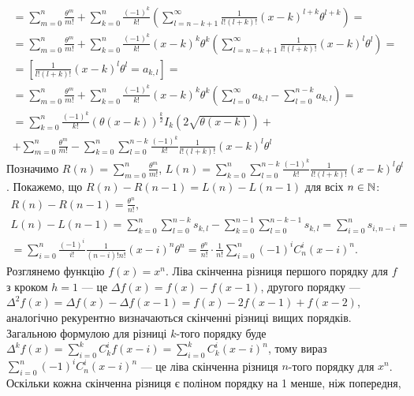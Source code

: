 \begin{gather*}
    = \sum_{m=0}^{n} \frac{\theta^m}{m!} + 
    \sum_{k=0}^{n} \frac{(-1)^k}{k!} \left(
        \sum_{l=n-k+1}^{\infty} \frac{1}{l! (l+k)!} (x - k)^{l+k} \theta^{l+k}
    \right) = \\ =
    \sum_{m=0}^{n} \frac{\theta^m}{m!} + 
    \sum_{k=0}^{n} \frac{(-1)^k}{k!} (x-k)^k \theta^k
    \left(
        \sum_{l=n-k+1}^{\infty} \frac{1}{l! (l+k)!} (x - k)^{l} \theta^{l}
    \right) = \\ = \left[\frac{1}{l! (l+k)!} (x - k)^{l} \theta^{l} = a_{k, l}\right] = \\ =
    \sum_{m=0}^{n} \frac{\theta^m}{m!} +
    \sum_{k=0}^{n} \frac{(-1)^k}{k!} (x-k)^k \theta^k
    \left(
        \sum_{l=0}^{\infty} a_{k, l} - 
        \sum_{l=0}^{n-k} a_{k, l} 
    \right) = \\
    = \sum_{k=0}^{n} \frac{(-1)^k}{k!}
    \left(\theta (x - k)\right)^{\frac{k}{2}} I_k\left(2\sqrt{\theta(x-k)}\right) + \\ +
    \sum_{m=0}^{n} \frac{\theta^m}{m!}
    - \sum_{k=0}^{n} \sum_{l=0}^{n-k}  \frac{(-1)^k}{k!} \frac{1}{l! (l+k)!} (x - k)^{l} \theta^{l}
\end{gather*} 
Позначимо $R(n) = \sum_{m=0}^{n} \frac{\theta^m}{m!}$,
$L(n) = \sum_{k=0}^{n} \sum_{l=0}^{n-k} \frac{(-1)^k}{k!} \frac{1}{l! (l+k)!} (x - k)^{l} \theta^{l}$.
Покажемо, що $R(n) - R(n-1) = L(n) - L(n-1)$ для всіх $n \in \mathbb{N}$:
\begin{gather*}
    R(n) - R(n-1) = \frac{\theta^n}{n!}, \\
    L(n) - L(n-1) = \sum_{k=0}^n \sum_{l=0}^{n-k} s_{k, l} - 
    \sum_{k=0}^{n-1} \sum_{l=0}^{n-k-1} s_{k, l} = \sum_{i=0}^n s_{i, n-i} = \\ =
    \sum_{i=0}^n \frac{(-1)^i}{i!} \frac{1}{(n-i)! n!} (x - i)^n \theta^n = 
    \frac{\theta^n}{n!} \cdot \frac{1}{n!} \sum_{i=0}^n (-1)^i C_n^i (x-i)^n.
\end{gather*}
Розглянемо функцію $f(x) = x^n$.
Ліва скінченна різниця першого порядку для $f$ з кроком $h=1$ --- це 
$\Delta f(x) = f(x) - f(x-1)$, другого порядку --- $\Delta^2 f(x) = \Delta f(x) - \Delta f(x-1) = 
f(x) - 2f(x-1) + f(x-2)$,
аналогічно рекурентно визначаються скінченні різниці вищих порядків.
Загальною формулою для різниці $k$-того порядку буде
$\Delta^k f(x) = \sum_{i=0}^k C_k^i f(x-i) = \sum_{i=0}^k C_k^i (x - i)^n$,
тому вираз $\sum_{i=0}^n (-1)^i C_n^i (x-i)^n$ --- це ліва скінченна різниця $n$-того порядку для
$x^n$. Оскільки кожна скінченна різниця є поліном порядку на 1 менше, ніж попередня,
